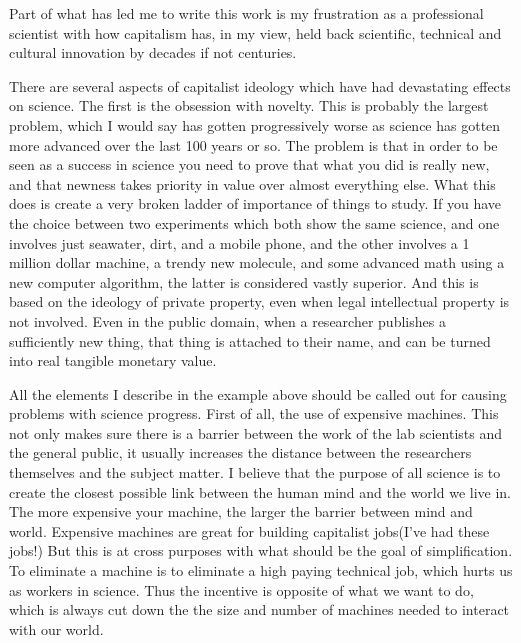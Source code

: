 Part of what has led me to write this work is my frustration as a
professional scientist with how capitalism has, in my view, held back
scientific, technical and cultural innovation by decades if not
centuries.

There are several aspects of capitalist ideology which have had
devastating effects on science. The first is the obsession with novelty.
This is probably the largest problem, which I would say has gotten
progressively worse as science has gotten more advanced over the last
100 years or so. The problem is that in order to be seen as a success in
science you need to prove that what you did is really new, and that
newness takes priority in value over almost everything else. What this
does is create a very broken ladder of importance of things to study. If
you have the choice between two experiments which both show the same
science, and one involves just seawater, dirt, and a mobile phone, and
the other involves a 1 million dollar machine, a trendy new molecule,
and some advanced math using a new computer algorithm, the latter is
considered vastly superior. And this is based on the ideology of private
property, even when legal intellectual property is not involved. Even in
the public domain, when a researcher publishes a sufficiently new thing,
that thing is attached to their name, and can be turned into real
tangible monetary value.

All the elements I describe in the example above should be called out
for causing problems with science progress. First of all, the use of
expensive machines. This not only makes sure there is a barrier between
the work of the lab scientists and the general public, it usually
increases the distance between the researchers themselves and the
subject matter. I believe that the purpose of all science is to create
the closest possible link between the human mind and the world we live
in. The more expensive your machine, the larger the barrier between mind
and world. Expensive machines are great for building capitalist
jobs(I've had these jobs!) But this is at cross purposes with what
should be the goal of simplification. To eliminate a machine is to
eliminate a high paying technical job, which hurts us as workers in
science. Thus the incentive is opposite of what we want to do, which is
always cut down the the size and number of machines needed to interact
with our world.

